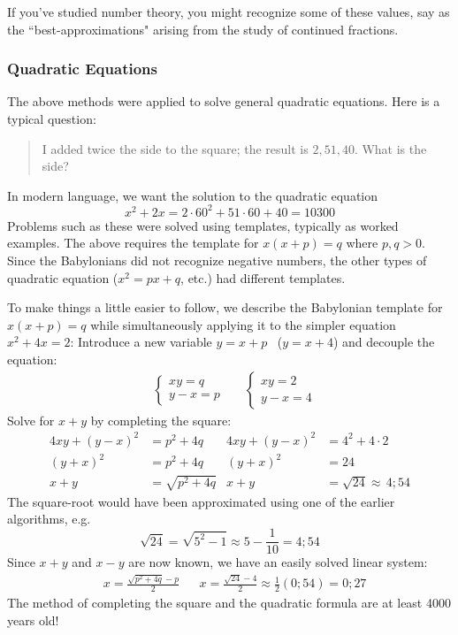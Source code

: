 If you've studied number theory, you might recognize some of these values, say as the ``best-approximations" arising from the study of continued fractions.

\subsubsection*{Quadratic Equations}

The above methods were applied to solve general quadratic equations. Here is a typical question:
\begin{quote}
	I added twice the side to the square; the result is $2,51,40$. What is the side?
\end{quote}
In modern language, we want the solution to the quadratic equation
\[
	x^2+2x=2\cdot 60^2+51\cdot 60+40=10300
\]
Problems such as these were solved using templates, typically as worked examples. The above requires the template for $x(x+p)=q$ where $p,q>0$. Since the Babylonians did not recognize negative numbers, the other types of quadratic equation ($x^2=px+q$, etc.) had different templates.

\pagebreak[3]

To make things a little easier to follow, we describe the Babylonian template for $x(x+p)=q$ while simultaneously applying it to the simpler equation $x^2+4x=2$:\smallbreak
Introduce a new variable $y=x+p$ \ ($y=x+4$) and decouple the equation:
\begin{align*}
	&
	\begin{cases}
		xy=q\\
		y-x=p
	\end{cases}
	&&
	\begin{cases}
		xy=2\\
		y-x=4
	\end{cases}
\end{align*}
Solve for $x+y$ by completing the square:
\begin{align*}
	4xy+(y-x)^2&=p^2+4q &4xy+(y-x)^2&=4^2+4\cdot 2\\
	(y+x)^2&=p^2+4q &(y+x)^2&=24\\
	x+y&=\sqrt{p^2+4q} &x+y&=\sqrt{24}\approx\,4;54
\end{align*}
The square-root would have been approximated using one of the earlier algorithms, e.g.
\[
	\sqrt{24}=\sqrt{5^2-1}\approx 5-\frac{1}{10}=4;54
\]
Since $x+y$ and $x-y$ are now known, we have an easily solved linear system:
\begin{align*}
	&x=\frac{\sqrt{p^2+4q}-p}2 
	&&x=\frac{\sqrt{24}-4}2 \approx \frac 12(0;54)= 0;27
\end{align*}
The method of completing the square and the quadratic formula are at least 4000 years old!
\medbreak


